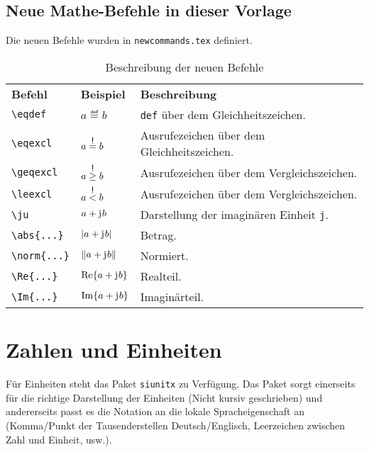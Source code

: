 \subsection{Neue Mathe-Befehle in dieser Vorlage}
Die neuen Befehle wurden in \verb|newcommands.tex| definiert.
\begin{table}[h]
	\centering
	\caption{Beschreibung der neuen Befehle}
	\label{tab:newmathcommands}
	\begin{tabular}{@{}L{0.15\textwidth}C{0.15\textwidth}L{0.6\textwidth}@{}}
		{\color[HTML]{FFFFFF} \textbf{Befehl}} & {\color[HTML]{FFFFFF} \textbf{Beispiel}} & {\color[HTML]{FFFFFF} \textbf{Beschreibung}}\\
		
		\verb|\eqdef| & $a\eqdef b$ & \verb|def| über dem Gleichheitszeichen.\\
		
		\verb|\eqexcl| & $a\eqexcl b$ & Ausrufezeichen über dem Gleichheitszeichen.\\
		
		\verb|\geqexcl| & $a\geqexcl b$ & Ausrufezeichen über dem Vergleichszeichen.\\
		
		\verb|\leexcl| & $a\leexcl b$ & Ausrufezeichen über dem Vergleichszeichen.\\
		
		\verb|\ju| & $a+{\mathrm{j}\mkern1mu} b$ & Darstellung der imaginären Einheit \verb|j|.\\
		
		\verb|\abs{...}| & $\lvert a+{\mathrm{j}\mkern1mu} b\rvert$ & Betrag.\\
		
		\verb|\norm{...}| & $\lVert a+{\mathrm{j}\mkern1mu} b\rVert$ & Normiert.\\
		
		\verb|\Re{...}| & $\Re{a+\ju b}$ & Realteil.\\
		
		\verb|\Im{...}| & $\Im{a+\ju b}$ & Imaginärteil.\\
	\end{tabular}
\end{table}

\section{Zahlen und Einheiten}
Für Einheiten steht das Paket \verb|siunitx| zu Verfügung. Das Paket sorgt einerseits für die richtige Darstellung der Einheiten (Nicht kursiv geschrieben) und andererseits passt es die Notation an die lokale Spracheigenschaft an (Komma/Punkt der Tausenderstellen Deutsch/Englisch, Leerzeichen zwischen Zahl und Einheit, usw.).

